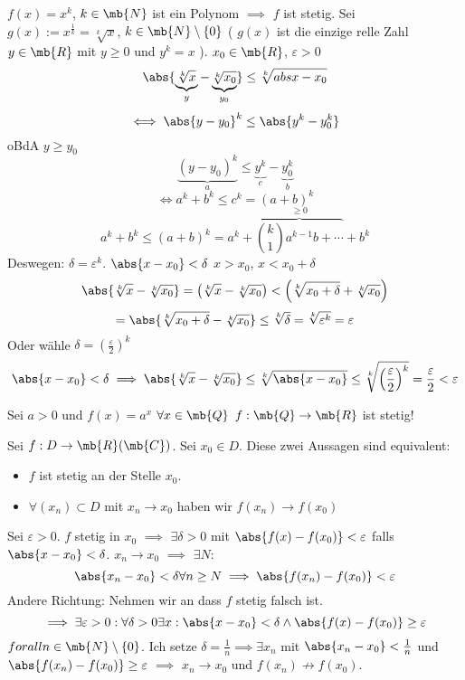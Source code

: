\begin{Bsp}
  $f(x)=x^k$, $k\in\mb{N}$ ist ein Polynom $\implies$ $f$ ist stetig. Sei $g(x):=x^\frac{1}{k}=\sqrt[k]{x}$, $k\in\mb{N}\setminus\left\{ 0 \right\}$ \left( $g(x)$ ist die einzige relle Zahl $y\in\mb{R}$ mit $y\geq 0$ und $y^k=x$ \right). $x_0\in\mb{R}$, $\varepsilon>0$
  \[\abs{\underbrace{\sqrt[k]{x}}_y-\underbrace{\sqrt[k]{x_0}}_{y_0}} \leq \sqrt[k]{abs{x-x_0}}\]
  \[\iff \abs{y-y_0}^k\leq\abs{y^k-y_0^k}\]
  oBdA $y\geq y_0$
  \[\underbrace{\left( y-y_0 \right)^k}_a\leq \underbrace{y^k}_c-\underbrace{y_0^k}_b\]
  \[\iff a^k+b^k\leq c^k=(a+b)^k\]
  \[a^k+b^k\leq (a+b)^k=a^k+\overbrace{\binom{k}{1}a^{k-1}b+\cdots}^{\geq 0}+b^k\]
  Deswegen: $\delta=\varepsilon^{k}$. $\abs{x-x_0}<\delta$ $x>x_0$, $x<x_0+\delta$
  \[\abs{\sqrt[k]{x}-\sqrt[k]{x_0}}=\left( \sqrt[k]{x}-\sqrt[k]{x_0} \right)<\left( \sqrt[k]{x_0+\delta}+\sqrt[k]{x_0} \right)\]
  \[=\abs{\sqrt[k]{x_0+\delta}-\sqrt[k]{x_0}}\leq\sqrt[k]{\delta}=\sqrt[k]{\varepsilon^k}=\varepsilon\]
  Oder wähle $\delta=\left( \frac{\varepsilon}{2} \right)^k$
  \[\abs{x-x_0}< \delta \implies \abs{\sqrt[k]{x}-\sqrt[k]{x_0}}\leq\sqrt[k]{\abs{x-x_0}}\leq\sqrt[k]{\left( \frac{\varepsilon}{2} \right)^k}=\frac{\varepsilon}{2}<\varepsilon\]
\end{Bsp}
\begin{Bsp}
  Sei $a>0$ und $f(x)=a^x$ $\forall x\in\mb{Q}$ $f:\mb{Q}\to\mb{R}$ ist stetig!
\end{Bsp}
\begin{Sat}
  Sei $f:D\to\mb{R}(\mb{C})$. Sei $x_0\in D$. Diese zwei Aussagen sind equivalent:
  \begin{itemize}
    \item $f$ ist stetig an der Stelle $x_0$.
    \item $\forall(x_n)\subset D$ mit $x_n\to x_0$ haben wir $f(x_n)\to f(x_0)$
  \end{itemize}
\end{Sat}
\begin{Bew}
  Sei $\varepsilon >0$. $f$ stetig in $x_0$ $\implies$ $\exists\delta>0$ mit $\abs{f(x)-f(x_0)}<\varepsilon$ falls $\abs{x-x_0}<\delta$. $x_n\to x_0$ $\implies$ $\exists N$:
  \[\abs{x_n-x_0}<\delta\forall n\geq N\implies \abs{f(x_n)-f(x_0)}<\varepsilon\]
  Andere Richtung: Nehmen wir an dass $f$ stetig falsch ist.
  \[\implies \exists \varepsilon>0: \forall \delta>0 \exists x: \abs{x-x_0}<\delta\wedge\abs{f(x)-f(x_0)}\geq \varepsilon\]
  $forall n\in\mb{N}\setminus\left\{ 0 \right\}$. Ich setze $\delta=\frac{1}{n}\implies \exists x_n$ mit $\abs{x_n-x_0}<\frac{1}{n}$ und $\abs{f(x_n)-f(x_0)}\geq \varepsilon$ $\implies$ $x_n\to x_0$ und $f(x_n)\not\to f(x_0)$.
\end{Bew}
